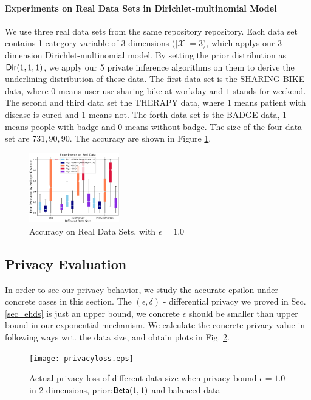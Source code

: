 \documentclass{article}
\begin{document}
\paragraph{Experiments on Real Data Sets in Dirichlet-multinomial Model}
We use three real data sets from the same repository repository. Each data set contains 1 category variable of 3 dimensions ($|\mathcal{X}| = 3$), which applys our 3 dimension Dirichlet-multinomial model. By setting the prior distribution as $\mathsf{Dir}(1,1,1)$, we apply our 5 private inference algorithms on them to derive the underlining distribution of these data. The first data set is the SHARING BIKE data, where $0$ means user use sharing bike at workday and $1$ stands for weekend. The second and third data set the THERAPY data, where $1$ means patient with disease is cured and $1$ means not. The forth data set is the BADGE data, $1$ means people with badge and $0$ means without badge. The size of the four data set are $731, 90, 90$. The accuracy are shown in Figure \ref{fig_real_3d}.
\begin{figure}
\centering
\includegraphics[width=0.35\textwidth]{realdata_3d.eps}
\caption{Accuracy on Real Data Sets, with $\epsilon = 1.0$}
\label{fig_real_3d}
\end{figure}


\subsection{Privacy Evaluation}
\label{subsec_experiment_privacy}
In order to see our privacy behavior, we study the accurate epsilon under concrete cases in this section. The $(\epsilon, \delta)$ - differential privacy we proved in Sec. \ref{sec_ehds} is just an upper bound, we concrete $\epsilon$ should be smaller than upper bound in our exponential mechanism. We calculate the concrete privacy value in following ways wrt. the data size, and obtain plots in Fig. \ref{fig_privacy}.

\begin{figure}
\begin{center}
\centering
    \texttt{[image: privacyloss.eps]}
\caption{Actual privacy loss of different data size when privacy bound $\epsilon = 1.0$ in 2 dimensions, prior:$\mathsf{Beta}(1,1)$ and balanced data}
\label{fig_privacy}
\end{center}
\end{figure}
\end{document}
